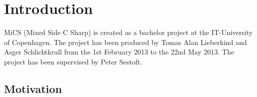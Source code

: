 
\chapter{Introduction} %
\label{cha:introduction}
	MiCS (Mixed Side C Sharp) is created as a bachelor project at the IT-University of Copenhagen. The project  has been produced by Tomas Alan Lieberkind and Asger Schlichtkrull from the 1st February 2013 to the 22nd May 2013. The project has been supervised by Peter Sestoft. 
	\section{Motivation} %
\label{sec:motivation}






